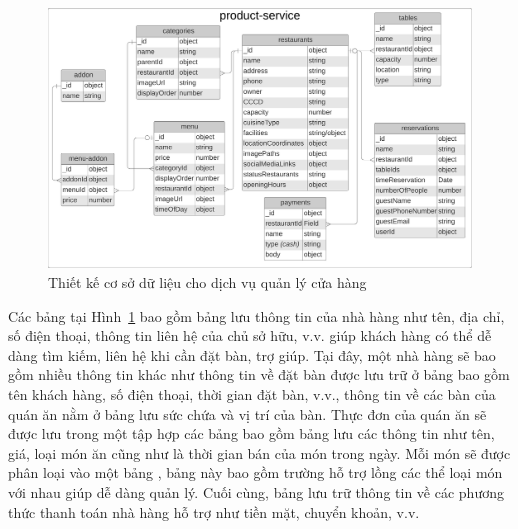 \begin{figure}[ht]
	\centering
	\includegraphics[width=\textwidth]{images/hChip/MongoDB/product-service-design.png}
	\caption{Thiết kế cơ sở dữ liệu cho dịch vụ quản lý cửa hàng}
	\label{fig:product-service-database-design}
\end{figure}

Các bảng tại Hình~\ref{fig:product-service-database-design} bao gồm bảng  lưu thông tin của nhà hàng như tên, địa chỉ, số điện thoại, thông tin liên hệ của chủ sở hữu, v.v. giúp khách hàng có thể dễ dàng tìm kiếm, liên hệ khi cần đặt bàn, trợ giúp.
Tại đây, một nhà hàng sẽ bao gồm nhiều thông tin khác như thông tin về đặt bàn được lưu trữ ở bảng  bao gồm tên khách hàng, số điện thoại, thời gian đặt bàn, v.v., thông tin về các bàn của quán ăn nằm ở bảng  lưu sức chứa và vị trí của bàn.
Thực đơn của quán ăn sẽ được lưu trong một tập hợp các bảng bao gồm bảng  lưu các thông tin như tên, giá, loại món ăn cũng như là thời gian bán của món trong ngày.
Mỗi món sẽ được phân loại vào một bảng , bảng này bao gồm trường  hỗ trợ lồng các thể loại món với nhau giúp dễ dàng quản lý.
Cuối cùng, bảng  lưu trữ thông tin về các phương thức thanh toán nhà hàng hỗ trợ như tiền mặt, chuyển khoản, v.v.

